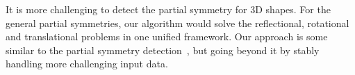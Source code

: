 It is more challenging to detect the partial symmetry for 3D shapes. For the general partial symmetries, our algorithm would solve the reflectional, rotational and translational problems in one unified framework. Our approach is some similar to the partial symmetry detection~\cite{berner2011}, but going beyond it by stably handling more challenging input data. 
